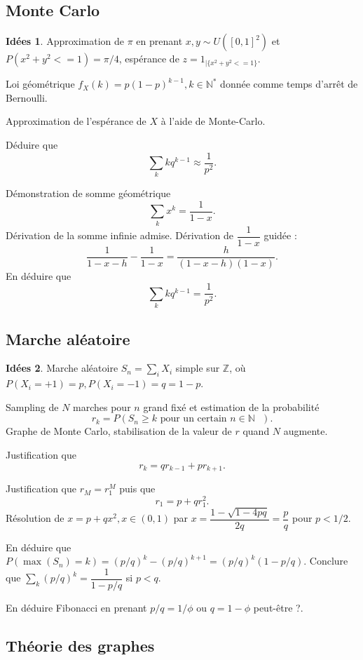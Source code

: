 \documentclass[a4paper,12pt, notitlepage]{article}
\theoremstyle{definition}
\newtheorem{idee}{Idées}
\newcommand{\N}{\mathbb{N}}
\begin{document}
\subsection{Monte Carlo}

\begin{idee}
	Approximation de $\pi$ en prenant $x,y \sim U([0,1]^2)$ et $P(x^2 + y^2 <= 1) = \pi/4$, espérance de $z = 1_{|\{x^2 + y^2 <= 1\}}$.

	Loi géométrique $f_X(k) = p(1-p)^{k-1}, k\in\N^*$ donnée comme temps d'arrêt de Bernoulli.
	
	Approximation de l'espérance de $X$ à l'aide de Monte-Carlo.
	
	Déduire que 
		\[ \sum_k k q^{k-1} \approx \dfrac1{p^2}. \]
		
	Démonstration de somme géométrique
		\[ \sum_k x^k = \dfrac1{1-x}. \]
	Dérivation de la somme infinie admise. Dérivation de $\dfrac1{1-x}$ guidée : 
		\[ \dfrac1{1-x-h} - \dfrac1{1-x} = \dfrac{h}{(1-x-h)(1-x)}. \]
	En déduire que
		\[ \sum_k k q^{k-1} = \dfrac1{p^2}. \]
	
\end{idee}


\subsection{Marche aléatoire}

\begin{idee}
	Marche aléatoire $S_n = \sum_i X_i$ simple sur $\mathbb{Z}$, où $P(X_i = +1) = p, P(X_i = -1) = q = 1-p$.
	
	Sampling de $N$ marches pour $n$ grand fixé et estimation de la probabilité
		\[ r_k = P(S_n \geq k \text{ pour un certain $n\in\N$ }). \]
	Graphe de Monte Carlo, stabilisation de la valeur de $r$ quand $N$ augmente.
	
	Justification que 
		\[ r_k = q r_{k-1} + p r_{k+1}. \]
		
	Justification que $r_M = r_1^M$ puis que
		\[ r_1 = p + q r_1^2. \]
	Résolution de $x = p + qx^2, x \in (0,1)$ par $x = \dfrac{1-\sqrt{1-4pq}}{2q} = \dfrac{p}{q}$ pour $p<1/2$.
	
	En déduire que $P(\max(S_n) = k) = (p/q)^k - (p/q)^{k+1} = (p/q)^k (1-p/q)$. 
	Conclure que $\sum_k (p/q)^k = \dfrac{1}{1-p/q}$ si $p<q$.
	
	En déduire Fibonacci en prenant $p/q = 1/\phi$ ou $q = 1-\phi$ peut-être ?.
\end{idee}


\subsection{Théorie des graphes}
\end{document}
